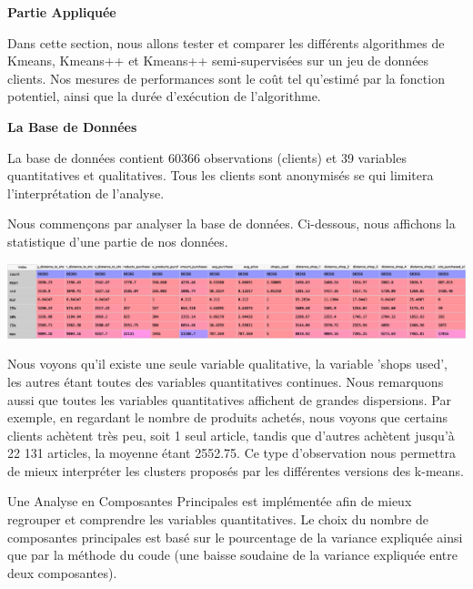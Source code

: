 \documentclass[ ]{article}
\begin{document}
\noindent
{\LARGE \textbf{Partie Appliquée}}
\vspace{5 mm}

\noindent
Dans cette section, nous allons tester et comparer les différents algorithmes de Kmeans, Kmeans++ et Kmeans++ semi-supervisées sur un jeu de données clients. Nos mesures de performances sont le coût tel qu'estimé par la fonction potentiel, ainsi que la durée d'exécution de l'algorithme.

\vspace{10 mm}

\noindent
{\Large \textbf{La Base de Données}}
\vspace{5 mm}

\noindent
La base de données contient 60366 observations (clients) et 39 variables quantitatives et qualitatives. Tous les clients sont anonymisés se qui limitera l'interprétation de l'analyse.

\noindent
Nous commençons par analyser la base de données. Ci-dessous, nous affichons la statistique d'une partie de nos données. 
\begin{center}
\includegraphics[scale=0.35]{summary.png}
\end{center}

\noindent
Nous voyons qu'il existe une seule variable qualitative, la variable 'shops used', les autres étant toutes des variables quantitatives continues. Nous remarquons aussi que toutes les variables quantitatives affichent de grandes dispersions. Par exemple, en regardant le nombre de produits achetés, nous voyons que certains clients achètent très peu, soit 1 seul article, tandis que d'autres achètent jusqu'à 22 131 articles, la moyenne étant 2552.75. Ce type d'observation nous permettra de mieux interpréter les clusters proposés par les différentes versions des k-means.

\noindent
Une Analyse en Composantes Principales est implémentée afin de mieux regrouper et comprendre les variables quantitatives. Le choix du nombre de composantes principales est basé sur le pourcentage de la variance expliquée ainsi que par la méthode du coude (une baisse soudaine de la variance expliquée entre deux composantes).
\end{document}
